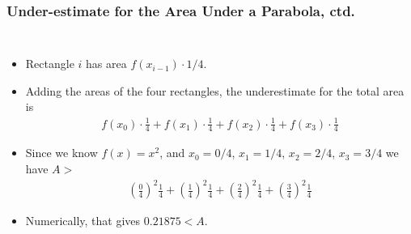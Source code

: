 \documentclass[serif,ignorenonframetext]{beamer}
\begin{document}
\begin{frame}
  \frametitle{Under-estimate for the Area Under a Parabola, ctd.}
  \begin{columns}
  \begin{itemize}[<+->]
  \item Rectangle $i$ has area $f(x_{i-1})\cdot 1/4$.
  \item Adding the areas of the four rectangles, 
    the underestimate for the total area is
    \begin{align*}
      f(x_0)\cdot\frac{1}{4}
      + f(x_1)\cdot\frac{1}{4}
      + f(x_2)\cdot\frac{1}{4}
      + f(x_3)\cdot\frac{1}{4}
    \end{align*}
  \item Since we know $f(x)=x^2$, and $x_0=0/4$, $x_1=1/4$, $x_2=2/4$,
    $x_3=3/4$ we have $A>$
    \begin{align*}
      \left(\frac{0}{4}\right)^2\frac{1}{4}
      + \left(\frac{1}{4}\right)^2\frac{1}{4}
      + \left(\frac{2}{4}\right)^2\frac{1}{4}
      + \left(\frac{3}{4}\right)^2\frac{1}{4}
    \end{align*}
  \item Numerically, that gives $0.21875<A$.
  \end{itemize}
  \end{columns}
\end{frame}
\end{document}
